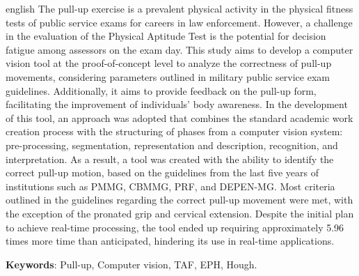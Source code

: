\documentclass[
	12pt,			%
	openany,		%
	oneside,		%
	a4paper,		%
	english,		%
	brazil			%
	]{abntex2}
\begin{document}
\begin{resumo}[Abstract]
 \begin{otherlanguage*}{english}
	The pull-up exercise is a prevalent physical activity in the physical fitness tests of public service exams for careers in law enforcement. However, a challenge in the evaluation of the Physical Aptitude Test is the potential for decision fatigue among assessors on the exam day.	This study aims to develop a computer vision tool at the proof-of-concept level to analyze the correctness of pull-up movements, considering parameters outlined in military public service exam guidelines. Additionally, it aims to provide feedback on the pull-up form, facilitating the improvement of individuals' body awareness. In the development of this tool, an approach was adopted that combines the standard academic work creation process with the structuring of phases from a computer vision system: pre-processing, segmentation, representation and description, recognition, and interpretation. As a result, a tool was created with the ability to identify the correct pull-up motion, based on the guidelines from the last five years of institutions such as \ac{PMMG}, \ac{CBMMG}, \ac{PRF}, and \ac{DEPEN-MG}. Most criteria outlined in the guidelines regarding the correct pull-up movement were met, with the exception of the pronated grip and cervical extension. Despite the initial plan to achieve real-time processing, the tool ended up requiring approximately 5.96 times more time than anticipated, hindering its use in real-time applications.

 \textbf{Keywords}: Pull-up, Computer vision, TAF, EPH, Hough.
 \end{otherlanguage*}
\end{resumo}


\listoffigures*
\cleardoublepage






\tableofcontents*
\cleardoublepage

\textual
\end{document}
